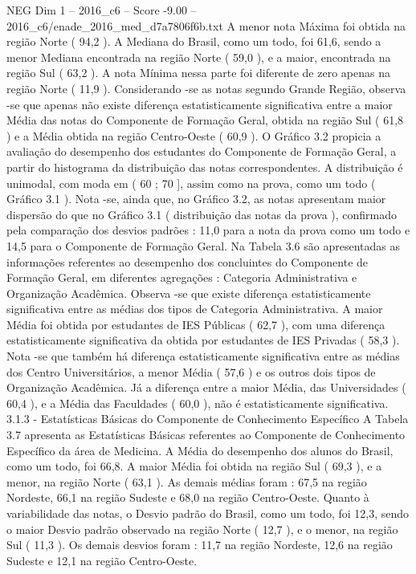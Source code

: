 \begin{textsample}{NEG Dim 1 – 2016\_c6 – Score -9.00 – 2016\_c6/enade\_2016\_med\_d7a7806f6b.txt}
A menor nota Máxima foi obtida na região Norte ( 94,2 ).
A Mediana do Brasil, como um todo, foi 61,6, sendo a menor Mediana encontrada na região Norte ( 59,0 ), e a maior, encontrada na região Sul ( 63,2 ).
A nota Mínima nessa parte foi diferente de zero apenas na região Norte ( 11,9 ).
Considerando -se as notas segundo Grande Região, observa -se que apenas não existe diferença estatisticamente significativa entre a maior Média das notas do Componente de Formação Geral, obtida na região Sul ( 61,8 ) e a Média obtida na região Centro-Oeste ( 60,9 ).
O Gráfico 3.2 propicia a avaliação do desempenho dos estudantes do Componente de Formação Geral, a partir do histograma da distribuição das notas correspondentes.
A distribuição é unimodal, com moda em ( 60 ; 70 ], assim como na prova, como um todo ( Gráfico 3.1 ).
Nota -se, ainda que, no Gráfico 3.2, as notas apresentam maior dispersão do que no Gráfico 3.1 ( distribuição das notas da prova ), confirmado pela comparação dos desvios padrões : 11,0 para a nota da prova como um todo e 14,5 para o Componente de Formação Geral.
Na Tabela 3.6 são apresentadas as informações referentes ao desempenho dos concluintes do Componente de Formação Geral, em diferentes agregações : Categoria Administrativa e Organização Acadêmica.
Observa -se que existe diferença estatisticamente significativa entre as médias dos tipos de Categoria Administrativa.
A maior Média foi obtida por estudantes de IES Públicas ( 62,7 ), com uma diferença estatisticamente significativa da obtida por estudantes de IES Privadas ( 58,3 ).
Nota -se que também há diferença estatisticamente significativa entre as médias dos Centro Universitários, a menor Média ( 57,6 ) e os outros dois tipos de Organização Acadêmica.
Já a diferença entre a maior Média, das Universidades ( 60,4 ), e a Média das Faculdades ( 60,0 ), não é estatisticamente significativa. 3.1.3 - Estatísticas Básicas do Componente de Conhecimento Específico A Tabela 3.7 apresenta as Estatísticas Básicas referentes ao Componente de Conhecimento Específico da área de Medicina.
A Média do desempenho dos alunos do Brasil, como um todo, foi 66,8.
A maior Média foi obtida na região Sul ( 69,3 ), e a menor, na região Norte ( 63,1 ).
As demais médias foram : 67,5 na região Nordeste, 66,1 na região Sudeste e 68,0 na região Centro-Oeste.
Quanto à variabilidade das notas, o Desvio padrão do Brasil, como um todo, foi 12,3, sendo o maior Desvio padrão observado na região Norte ( 12,7 ), e o menor, na região Sul ( 11,3 ).
Os demais desvios foram : 11,7 na região Nordeste, 12,6 na região Sudeste e 12,1 na região Centro-Oeste.

\end{textsample}
